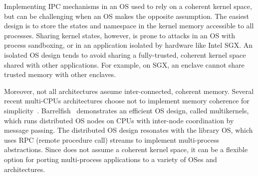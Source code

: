 Implementing IPC mechanisms in an OS used to rely on a coherent kernel space, but can be challenging when an OS makes the opposite assumption.
The easiest design is to store the states and namespace in the kernel memory accessible to all processes.
Sharing kernel states, however, is prone to attacks in an OS with process sandboxing,
or in an application
isolated by hardware like Intel SGX.
An isolated OS design tends to avoid sharing a fully-trusted, coherent kernel space shared with other applications.
For example, on SGX, an enclave cannot share trusted memory with other enclaves.


Moreover, not all architectures assume inter-connected, coherent memory.
Several recent multi-CPUs architectures choose not to implement memory coherence for simplicity~\cite{gschwind2007,cascaval2002evaluation}.
Barrelfish~\cite{baumann09barrelfish} demonstrates an efficient OS design, called multikernels, which runs distributed OS nodes on CPUs with inter-node coordination by message passing.
The distributed OS design resonates with the \graphene{} library OS, which uses RPC (remote procedure call) streams to implement multi-process abstractions.
Since \graphene{} does not assume a coherent kernel space, it can be a flexible option
for porting multi-process applications to a variety of OSes and architectures.





\begin{comment}
The implementation of Linux IPC mechanisms originally relies on storing global variables
in a unified kernel space,
but can be challenging for a hardware platform without coherent memory.
Several new hardware platforms choose not to have inter-connected memory,
including innovative multi-core designs~\cite{gschwind2007,cascaval2002evaluation},
and the physically-encrypted SGX enclaves.
Distributing OS states across CPU cores without a unified memory space
brings challenges to OS development,
as well as significant overheads on any coordination-intensive
system calls~\cite{baumann09barrelfish}.
\end{comment}



